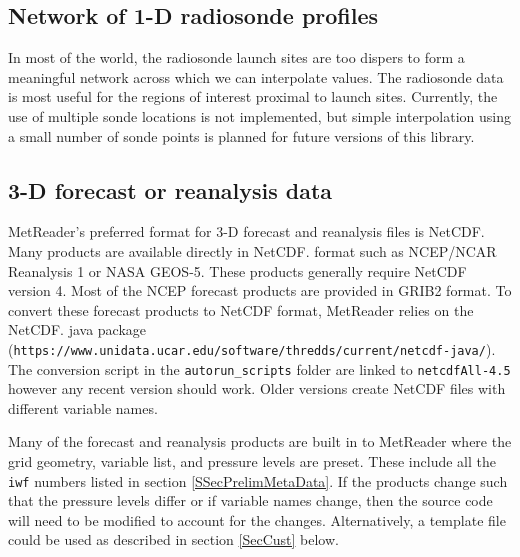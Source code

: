 \documentclass[11pt]{article}   %
\begin{document}
\subsection{Network of 1-D radiosonde profiles}
In most of the world, the radiosonde launch sites are too dispers to form
a meaningful network across which we can interpolate values.  The radiosonde
data is most useful for the regions of interest proximal to launch sites.
Currently, the use of multiple sonde locations is not implemented, but simple
interpolation using a small number of sonde points is planned for future
versions of this library.

\subsection{3-D forecast or reanalysis data}
MetReader's preferred format for 3-D forecast and reanalysis files is NetCDF.  Many
products are available directly in NetCDF. format such as NCEP/NCAR Reanalysis 1 or
NASA GEOS-5.  These products generally require NetCDF version 4.  Most of the NCEP
forecast products are provided in GRIB2 format.  To convert these forecast products
to NetCDF format, MetReader relies on the NetCDF. java package\\
(\texttt{https://www.unidata.ucar.edu/software/thredds/current/netcdf-java/}).  The
conversion script in the \texttt{autorun\_scripts} folder are linked to \texttt{netcdfAll-4.5}
however any recent version should work.  Older versions create NetCDF files with
different variable names.

Many of the forecast and reanalysis products are built in to MetReader where the
grid geometry, variable list, and pressure levels are preset.  These include all
the \texttt{iwf} numbers listed in section \ref{SSecPrelimMetaData}.  If the
products change such that the pressure levels differ or if variable names change,
then the source code will need to be modified to account for the changes.
Alternatively, a template file could be used as described in section \ref{SecCust} below.
\end{document}
